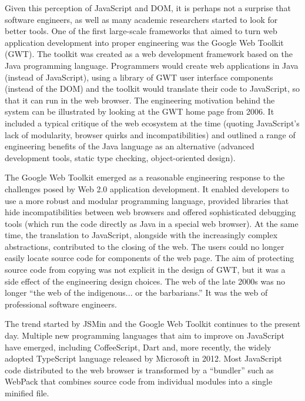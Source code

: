 Given this perception of JavaScript and DOM, it is perhaps not a surprise that software engineers,
as well as many academic researchers started to look for better tools.
One of the first large-scale frameworks that aimed to turn
web application development into proper engineering was the Google Web Toolkit (GWT).
The toolkit was created as a web development framework based on the Java programming language.
Programmers would create web applications in Java (instead of JavaScript), using a library of
GWT user interface components (instead of the DOM) and the toolkit would translate their code
to JavaScript, so that it can run in the web browser. The engineering motivation behind the
system can be illustrated by looking at the GWT home page from 2006. It included a typical
critique of the web ecosystem at the time (quoting JavaScript's lack of modularity, browser
quirks and incompatibilities) and outlined a range of engineering benefits of the Java language
as an alternative (advanced development tools, static type checking, object-oriented design).

The Google Web Toolkit emerged as a reasonable engineering response to the challenges posed by Web 2.0
application development. It enabled developers to use a more robust and modular programming
language, provided libraries that hide incompatibilities between web browsers and offered sophisticated
debugging tools (which run the code directly as Java in a special web browser). At the same time,
the translation to JavaScript, alongside with the increasingly complex abstractions, contributed
to the closing of the web. The users could no longer easily locate source code for components of
the web page. The aim of protecting source code from copying was not explicit in the design
of GWT, but it was a side effect of the engineering design choices. The web of the late 2000s
was no longer  ``the web of the indigenous... or the barbarians.'' It was the web of
professional software engineers.

\newpage

The trend started by JSMin and the Google Web Toolkit continues to the present day. Multiple new
programming languages that aim to improve on Java\-Script have emerged, including CoffeeScript, Dart
and, more recently, the widely adopted TypeScript language released by Microsoft in 2012. Most JavaScript code
distributed to the web browser is transformed by a ``bundler'' such as WebPack that combines
source code from individual modules into a single minified file.

